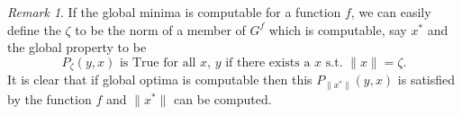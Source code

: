 \documentclass[a4paper,11pt]{article}
\theoremstyle{definition}
\theoremstyle{remark}
\newtheorem{remark}[theorem]{Remark}
\begin{document}
	\begin{remark}
		If the global minima is computable for a function $f$, we can easily define the $\zeta$ to be the norm of a member of $G^f$ which is computable, say $x^*$ and the global property to be 
		\[ P_{\zeta}(y,x) \mbox{ is True for all } x, \, y \mbox{ if there exists a } x \mbox{ s.t. } \parallel x \parallel = \zeta.\]
		It is clear that if global optima is computable then this $P_{\parallel x^* \parallel}(y,x)$ is satisfied by the function $f$ and $\parallel x^* \parallel$ can be computed.
		
		
		
		
	\end{remark}
	
\end{document}
